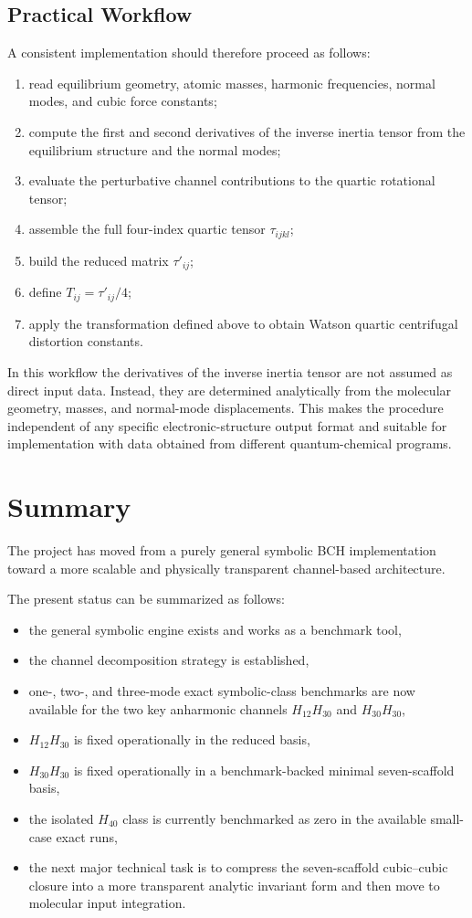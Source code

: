 \documentclass[11pt,a4paper]{article}
\begin{document}
\subsection{Practical Workflow}
A consistent implementation should therefore proceed as follows:
\begin{enumerate}[leftmargin=*]
\item read equilibrium geometry, atomic masses, harmonic frequencies, normal modes, and cubic force constants;
\item compute the first and second derivatives of the inverse inertia tensor from the equilibrium structure and the normal modes;
\item evaluate the perturbative channel contributions to the quartic rotational tensor;
\item assemble the full four-index quartic tensor \(\tau_{ijkl}\);
\item build the reduced matrix \(\tau'_{ij}\);
\item define \(T_{ij}=\tau'_{ij}/4\);
\item apply the transformation defined above to obtain Watson quartic centrifugal distortion constants.
\end{enumerate}

In this workflow the derivatives of the inverse inertia tensor are not assumed as direct input data. Instead, they are determined analytically from the molecular geometry, masses, and normal-mode displacements. This makes the procedure independent of any specific electronic-structure output format and suitable for implementation with data obtained from different quantum-chemical programs.

\section{Summary}
The project has moved from a purely general symbolic BCH implementation toward a more scalable and physically transparent channel-based architecture.

The present status can be summarized as follows:
\begin{itemize}[leftmargin=*]
\item the general symbolic engine exists and works as a benchmark tool,
\item the channel decomposition strategy is established,
\item one-, two-, and three-mode exact symbolic-class benchmarks are now available for the two key anharmonic channels \(H_{12}H_{30}\) and \(H_{30}H_{30}\),
\item \(H_{12}H_{30}\) is fixed operationally in the reduced basis,
\item \(H_{30}H_{30}\) is fixed operationally in a benchmark-backed minimal seven-scaffold basis,
\item the isolated \(H_{40}\) class is currently benchmarked as zero in the available small-case exact runs,
\item the next major technical task is to compress the seven-scaffold cubic--cubic closure into a more transparent analytic invariant form and then move to molecular input integration.
\end{itemize}
\end{document}
